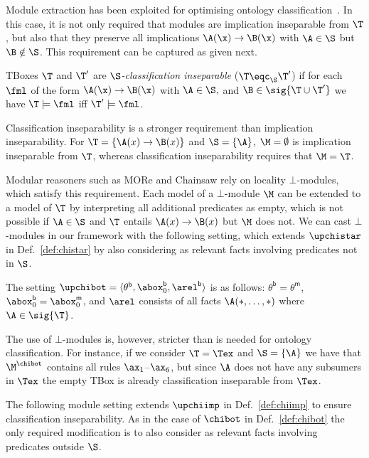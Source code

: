 Module extraction has been 
exploited for 
optimising ontology classification~\cite{DBLP:conf/semweb/RomeroGH12,DBLP:conf/ore/TsarkovP12,DBLP:journals/jar/GrauHKS10}.
In this case, it is not only required that 
modules are implication inseparable from $\T$, but also that they
preserve all implications  $\A(\x) \to \B(\x)$ with 
$\A\in \S$ but $\B \notin \S$. This requirement
can be captured as given next.

\begin{definition}
  TBoxes $\T$ and $\T'$ are \emph{$\S$-classification inseparable}
  ($\T\eqc_{\S}\T'$) if for each $\fml$ of the form $\A(\x)\to\B(\x)$
  with $\A\in\S, $ and
  $\B\in\sig{\T\cup\T'}$ we have $\T\models\fml$ iff $\T'\models\fml$.
 \end{definition}
% 
Classification inseparability is a stronger requirement
than implication inseparability. For
$\T = \{ \A(x) \to \B(x)\}$ and $\S = \{ \A \}$,
$\M = \emptyset$ is implication inseparable from $\T$, whereas
classification inseparability requires that $\M = \T$. 

Modular reasoners such as MORe and Chainsaw rely on
locality $\bot$-modules, which satisfy this requirement.
Each model of a $\bot$-module $\M$ can be extended
to a model of $\T$ by interpreting all additional predicates as empty, which
is not possible if $\A \in \S$ and $\T$ entails $\A(x) \to \B(x)$ but $\M$ does not.
We can cast $\bot$-modules in our framework with
the following setting, which extends $\upchistar$
in Def.~\ref{def:chistar} by also considering
as relevant facts involving predicates not in $\S$.
%
\begin{definition} \label{def:chibot}
  The setting $\upchibot=\langle \theta^{\mathsf{b}}, \abox_0^{\mathsf{b}}, \arel^{\mathsf{b}} \rangle$ is as
  follows: $\theta^{\mathsf{b}} = \theta^{\mathsf{m}}$, 
  $\abox_0^{\mathsf{b}} = \abox_0^{\mathsf{m}}$, and 
  $\arel$ consists of all facts $\A(\ast, \ldots, \ast)$ where
  $\A\in\sig{\T}$.\qedhere
\end{definition}
%
The use of $\bot$-modules is, however, 
stricter than is needed for ontology classification.
For instance, if we consider
$\T = \Tex$ and $\S = \{\A\}$ we have
that $\M^{\chibot}$ contains all rules
$\ax_1$--$\ax_6$, but since $\A$ does not
have any subsumers in $\Tex$ the empty TBox
is already classification inseparable from $\Tex$.

The following module setting extends
$\upchiimp$ in Def.\ \ref{def:chiimp}
to ensure classification inseparability.
As in the case of $\chibot$ in Def.~\ref{def:chibot}
the only required modification is to
also consider as relevant facts 
involving predicates outside $\S$.

